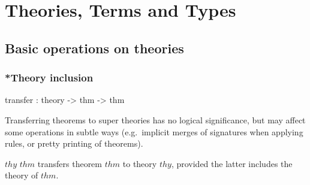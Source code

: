 
\chapter{Theories, Terms and Types} \label{theories}

\section{Basic operations on theories}\label{BasicOperationsOnTheories}

\subsection{*Theory inclusion}
\begin{ttbox}
transfer    : theory -> thm -> thm
\end{ttbox}

Transferring theorems to super theories has no logical significance,
but may affect some operations in subtle ways (e.g.\ implicit merges
of signatures when applying rules, or pretty printing of theorems).

\begin{ttdescription}

\item[\ttindexbold{transfer} $thy$ $thm$] transfers theorem $thm$ to
  theory $thy$, provided the latter includes the theory of $thm$.
  
\end{ttdescription}


